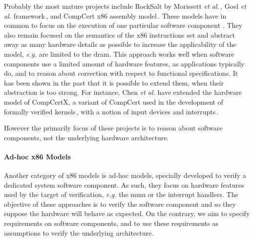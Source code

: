 Probably the most mature projects include RockSalt by Morissett \emph{et
  al.}\,\cite{morrisett2012rocksalt}, Goel \emph{et al.}
framework\,\cite{goel2014x86}, and CompCert x86 assembly
model\,\cite{leroy2012compcert}.
%
These models have in common to focus on the execution of one particular software
component . They also remain focused on the semantics of the x86 instructions
set and abstract away as many hardware details as possible to increase the
applicability of the model, \emph{e.g.} are limited to the \ac{dram}.
%
This approach works well when software components use a limited amount of
hardware features, as applications typically do, and to reason about correction
with respect to functional specifications.
%
It has been shown in the past that it is possible to extend them, when their
abstraction is too strong.
%
For instance, Chen \emph{et al.} have extended the hardware model of CompCertX,
a variant of CompCert used in the development of formally verified
kernels\,\cite{gu2016certikos}, with a notion of input devices and
interrupts\,\cite{chen2018interrupt}.

However the primarily focus of these projects is to reason about software
components, not the underlying hardware architecture.

\paragraph{Ad-hoc x86 Models}
%
Another category of x86 models is ad-hoc models, specially developed to verify a
dedicated system software component.
%
As such, they focus on hardware features used by the target of verification,
\emph{e.g.} the \ac{mmu} or the interrupt handlers. The objective of these
approaches is to verify the software component and so they suppose the hardware
will behave as expected.
%
On the contrary, we aim to specify requirements on software components, and to
use these requirements as assumptions to verify the underlying architecture.

